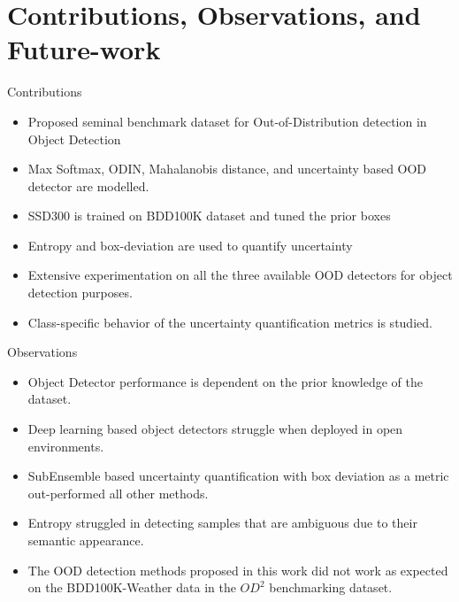 \documentclass[10pt, aspectratio=169]{beamer}
\begin{document}
\section{Contributions, Observations, and Future-work}
\begin{frame}[allowframebreaks]{Contributions}
    \begin{itemize}
        \item Proposed seminal benchmark dataset for Out-of-Distribution detection in Object Detection
        \item Max Softmax, ODIN, Mahalanobis distance, and uncertainty based OOD detector are modelled.
        \item SSD300 is trained on BDD100K dataset and tuned the prior boxes
        \item Entropy and box-deviation are used to quantify uncertainty 
        \item Extensive experimentation on all the three available OOD detectors for object detection purposes. 
        \item Class-specific behavior of the uncertainty quantification metrics is studied.
    \end{itemize}
\end{frame}

\begin{frame}[allowframebreaks]{Observations}
    \begin{itemize}
        \item Object Detector performance is dependent on the prior knowledge of the dataset. 
        \item Deep learning based object detectors struggle when deployed in open environments.
        \item SubEnsemble based uncertainty quantification with box deviation as a metric out-performed all other methods.
        \item Entropy struggled in detecting samples that are ambiguous due to their semantic appearance.
        \item The OOD detection methods proposed in this work did not work as expected on the BDD100K-Weather data in the $OD^2$ benchmarking dataset.
    \end{itemize}
\end{frame}
\end{document}
